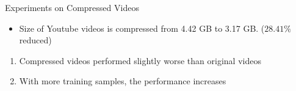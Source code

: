 \begin{frame}{Experiments on Compressed Videos}

\begin{itemize}
	\item Size of Youtube videos is compressed from 4.42 GB to 3.17 GB. ($28.41 \%$ reduced)
	
	\vspace{5mm}
	\begin{table}[!ht]
  	\begin{center}
    \end{center}
    \caption{Means and standard deviations (percent) of MAPs over six events}
	\end{table}
\end{itemize}
		
	\begin{enumerate}	
		\item Compressed videos performed slightly worse than original videos
		\item With more training samples, the performance increases
	\end{enumerate}

\end{frame}